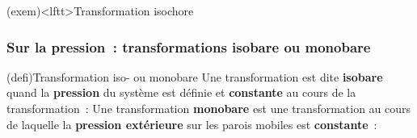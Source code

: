 \documentclass[../../main/main.tex]{subfiles}
\begin{document}
\begin{tcb}[sidebyside](exem)<lftt>{Transformation isochore}
	\tcblower
	\begin{center}
		\vspace{-15pt}
	\end{center}
\end{tcb}

\subsubsection{Sur la pression~: transformations isobare ou monobare}
\begin{tcb*}[sidebyside](defi){Transformation iso- ou monobare}
	Une transformation est dite \textbf{isobare} quand la \textbf{pression} du
	système est définie et \textbf{constante} au cours de la transformation~:
	\psw{%
		\[
			\boxed{P = \cte \Lra \dd{P} = 0}
		\]
	}%
	\vspace{-15pt}
	\tcblower
	Une transformation \textbf{monobare} est une transformation au cours de
	laquelle la \textbf{pression extérieure} sur les parois mobiles est
	\textbf{constante}~: \psw{%
		\[
			\boxed{P\ind{ext} = \cte}
		\]
	}%
	\vspace{-15pt}
\end{tcb*}
\end{document}
